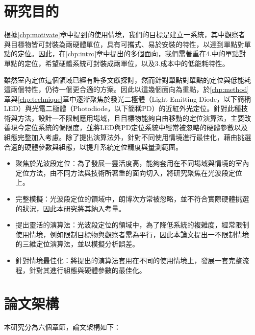 \section{研究目的}
\label{chp:purpose}

根據\ref{chp:motivate}章中提到的使用情境，我們的目標是建立一系統，其中觀察者與目標物皆可封裝為兩硬體單位，具有可攜式、易於安裝的特性，以達到單點對單點的定位。因此，在\ref{chp:intro}章中提出的多個面向，我們需著重在4.中的單點對單點的定位，希望硬體系統可封裝成兩單位，以及3.成本中的低能耗特性。

雖然室內定位這個領域已經有許多文獻探討，然而針對單點對單點的定位與低能耗這兩個特性，仍待一個更合適的方案。因此以這幾個面向為重點，於\ref{chp:method}章與\ref{chp:technique}章中逐漸聚焦於發光二極體（Light Emitting Diode，以下簡稱LED）與光電二極體（Photodiode，以下簡稱PD）的近紅外光定位。針對此種技術與方法，設計一不限制應用場域，且目標物能夠自由移動的定位演算法，主要改善現今定位系統的侷限度，並將LED與PD定位系統中經常被忽略的硬體參數以及組態完整加入考慮。除了提出演算法外，針對不同使用情境進行最佳化，藉由挑選合適的硬體參數與組態，以提升系統定位精度與量測範圍。




\begin{itemize} 
    \item{聚焦於光波段定位}：為了發展一靈活度高，能夠套用在不同場域與情境的室內定位方法，由不同方法與技術所著重的面向切入，將研究聚焦在光波段定位上。
    \item{完整模擬}：光波段定位的領域中，朗博次方常被忽略，並不符合實際硬體挑選的狀況，因此本研究將其納入考量。
    \item{提出靈活的演算法}：光波段定位的領域中，為了降低系統的複雜度，經常限制使用情境，例如限制目標物與觀察者需為平行，因此本論文提出一不限制情境的三維定位演算法，並以模擬分析誤差。
    \item{針對情境最佳化}：將提出的演算法套用在不同的使用情境上，發展一套完整流程，針對其進行組態與硬體參數的最佳化。
\end{itemize}









\section{論文架構}
本研究分為六個章節，論文架構如下：

